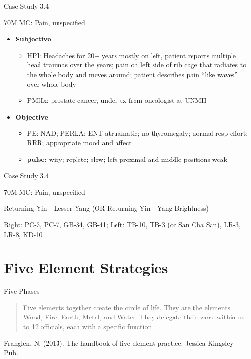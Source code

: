 \begin{frame}{Case Study 3.4}

70M MC: Pain, unspecified

\begin{itemize}
\item \textbf{Subjective}
\begin{itemize}
\item HPI: Headaches for 20+ years mostly on left, patient reports multiple head traumas over the years; pain on left side of rib cage that radiates to the whole body and moves around; patient describes pain ``like waves'' over whole body
\item PMHx: prostate cancer, under tx from oncologist at UNMH
\end{itemize}
\item \textbf{Objective}
\begin{itemize}
\item PE: NAD; PERLA; ENT atruamatic; no thyromegaly; normal resp effort; RRR; appropriate mood and affect
\item \textbf{pulse:} wiry; replete; slow; left proximal and middle positions weak
\end{itemize}
\end{itemize}

\end{frame}

\begin{frame}{Case Study 3.4}

70M MC: Pain, unspecified

\begin{as}
Returning Yin - Lesser Yang (OR Returning Yin - Yang Brightness)
\end{as}

\vspace{1em}

\begin{pln}
Right: PC-3, PC-7, GB-34, GB-41; Left: TB-10, TB-3 (or San Cha San), LR-3, LR-8, KD-10
\end{pln}

\end{frame}

\section{Five Element Strategies}
\begin{frame}{Five Phases}

\begin{quote}
Five elements together create the circle of life. They are the elements Wood, Fire, Earth, Metal, and Water. They delegate their work within us to 12 officials, each with a specific function
\end{quote}

Franglen, N. (2013). The handbook of five element practice. Jessica Kingsley Pub.

\end{frame}
